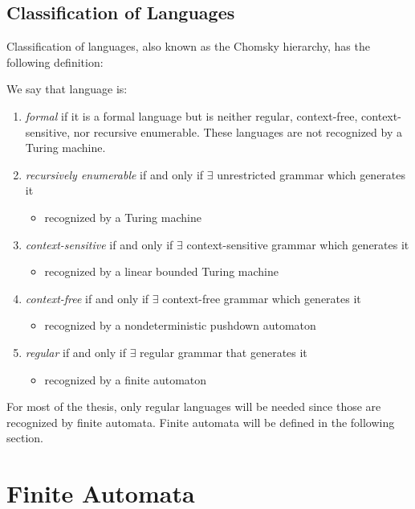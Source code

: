 \subsection{Classification of Languages}
Classification of languages, also known as the Chomsky hierarchy, has the following definition:
\begin{definition}
    We say that language is:
\end{definition}
\begin{enumerate}
    \item \textit{formal} if it is a formal language but is neither regular, context-free, context-sensitive, nor recursive enumerable. These languages are not recognized by a Turing machine.
    \item \textit{recursively enumerable} if and only if $\exists$ unrestricted grammar which generates it
    \begin{itemize}
        \item recognized by a Turing machine
    \end{itemize}
    \item \textit{context-sensitive} if and only if $\exists$ context-sensitive grammar which generates it
    \begin{itemize}
        \item recognized by a linear bounded Turing machine
    \end{itemize}
    \item \textit{context-free} if and only if $\exists$ context-free grammar which generates it
    \begin{itemize}
        \item recognized by a nondeterministic pushdown automaton
    \end{itemize}
    \item \textit{regular} if and only if $\exists$ regular grammar that generates it
    \begin{itemize}
        \item recognized by a finite automaton
    \end{itemize}
\end{enumerate}

For most of the thesis, only regular languages will be needed since those are recognized by finite automata. Finite automata will be defined in the following section.

\section{Finite Automata}

